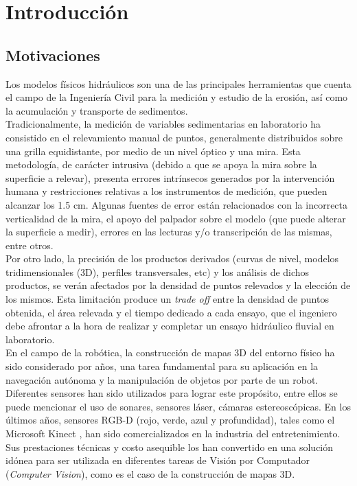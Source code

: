 \chapter{Introducci\'{o}n}

\section{Motivaciones}
\label{sec:motivaciones}

Los modelos físicos hidráulicos son una de las principales herramientas que cuenta el campo de la Ingeniería Civil para la medición y estudio de la erosión, así como la acumulación y transporte de sedimentos. \\
Tradicionalmente, la medición de variables sedimentarias en laboratorio ha consistido en el relevamiento manual de puntos, generalmente distribuidos sobre una grilla equidistante, por medio de un nivel óptico y una mira. Esta metodología, de carácter intrusiva (debido a que se apoya la mira sobre la superficie a relevar), presenta errores intrínsecos generados por la intervención humana y restricciones relativas a los instrumentos de medición, que pueden alcanzar los 1.5 cm. Algunas fuentes de error están relacionados con la incorrecta verticalidad de la mira, el apoyo del palpador sobre el modelo (que puede alterar la superficie a medir), errores en las lecturas y/o transcripción de las mismas, entre otros. \\
Por otro lado, la precisión de los productos derivados (curvas de nivel\cite{wiki-curva-de-nivel}, modelos tridimensionales (3D), perfiles transversales, etc) y los análisis de dichos productos, se verán afectados por la densidad de puntos relevados y la elección de los mismos. Esta limitación produce un \textit{trade off} entre la densidad de puntos obtenida, el área relevada y el tiempo dedicado a cada ensayo, que el ingeniero debe afrontar a la hora de realizar y completar un ensayo hidráulico fluvial en laboratorio. \\
En el campo de la robótica, la construcción de mapas 3D del entorno físico ha sido considerado por años, una tarea fundamental para su aplicación en la navegación autónoma y la manipulación de objetos por parte de un robot. Diferentes sensores han sido utilizados para lograr este propósito, entre ellos se puede mencionar el uso de sonares\cite{varveropoulos2005robot}, sensores láser\cite{chou2013robotic}, cámaras estereoscópicas\cite{Konolige08}.
En los últimos años, sensores RGB-D (rojo, verde, azul y profundidad), tales como el Microsoft Kinect \cite{microsoft-kinect}, han sido comercializados en la industria del entretenimiento. Sus prestaciones técnicas y costo asequible los han convertido en una solución idónea para ser utilizada en diferentes tareas de Visión por Computador (\textit{Computer Vision}), como es el caso de la construcción de mapas 3D\cite{henry2010rgb}\cite{engelhard2011real}. \\

